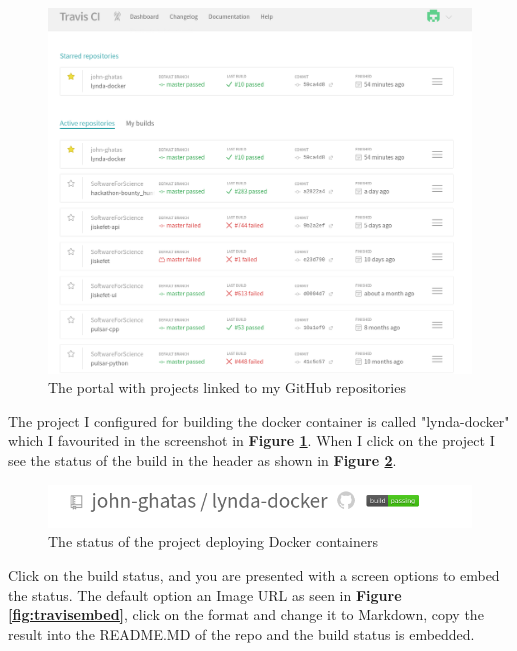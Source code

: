 \documentclass{paper}
\begin{document}
{{    \begin{figure}[H]
        \centering
        \includegraphics[scale=1.2, pagebox=artbox]{Images/travisportal.png}
        \caption{The portal with projects linked to my GitHub repositories}
        \label{fig:travisportal}
    \end{figure}
    \noindent The project I configured for building the docker container is called "lynda-docker" which I favourited in the screenshot in
    \textbf{Figure \ref{fig:travisportal}}. When I click on the project I see the status of the build in the header as  shown 
    in \textbf{Figure \ref{fig:travisstatus}}.
    \begin{figure}[H]
        \centering
        \includegraphics[scale=1.2, pagebox=artbox]{Images/travisheader.png}
        \caption{The status of the project deploying Docker containers}
        \label{fig:travisstatus}
    \end{figure}
    \newpage
    \noindent Click on the build status, and you are presented with a screen options to embed the status. 
    The default option an Image URL as seen in \textbf{Figure \ref{fig:travisembed}}, click on the format and change it to
    Markdown, copy the result into the README.MD of the repo and the build status is embedded.
    \begin{figure}[H]

\end{figure}}}
\end{document}
